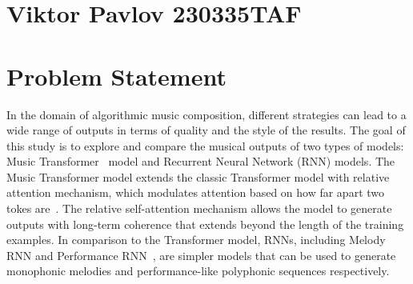 \documentclass[twocolumn]{article}
\author{Name Surname }
\begin{document}
\section*{Viktor Pavlov 230335TAF}
\section{Problem Statement}
In the domain of algorithmic music composition, different strategies can lead to a wide range of outputs in terms of quality and the style of the results. The goal of this study is to explore and compare the musical outputs of two types of models: Music Transformer~\cite{huang2018music} model and Recurrent Neural Network (RNN) models. The Music Transformer model extends the classic Transformer model with relative attention mechanism, which modulates attention based on how far apart two tokes are~\cite{shaw2018selfattention}. The relative self-attention mechanism allows the model to generate outputs with long-term coherence that extends beyond the length of the training examples. In comparison to the Transformer model, RNNs, including Melody RNN and Performance RNN~\cite{46748}, are simpler models that can be used to generate monophonic melodies and performance-like polyphonic sequences respectively.
\end{document}
